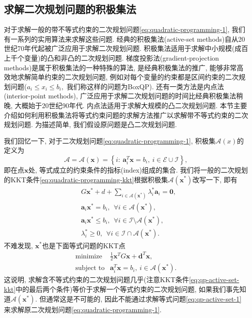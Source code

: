 \documentclass{SBCbookchapter}
\newcommand{\V}[1]{{\bm{#1}}}
\numberwithin{equation}{section}
\begin{document}
\subsection{求解二次规划问题的积极集法}
\label{subsec:7.2.2}

对于求解一般的带不等式约束的二次规划问题\eqref{eq:quadratic-programming-1}, 我们有一系列的实用算法来求解这些问题. 经典的积极集法(active-set methods)自从20世纪70年代起被广泛应用于求解二次规划问题. 积极集法适用于求解中小规模(成百上千个变量)的凸和非凸的二次规划问题. 梯度投影法(gradient-projection methods)是属于积极集法的一种特殊的算法, 是经典积极集法的推广, 能够非常高效地求解简单约束的二次规划问题, 例如对每个变量的约束都是区间约束的二次规划问题($a_i \leqslant x_i \leqslant b_i,$ 我们称这样的问题为BoxQP). 还有一类方法是内点法(interior-point methods), 广泛应用于求解二次规划问题的时间比经典积极集法稍晚, 大概始于20世纪90年代. 内点法适用于求解大规模的凸二次规划问题. 本节主要介绍如何利用积极集法将等式约束问题的求解方法推广以求解带不等式约束的二次规划问题. 为描述简单, 我们假设原问题是凸二次规划问题.

我们回忆一下, 对于二次规划问题\eqref{eq:quadratic-programming-1}, 积极集$\mathcal{A}(x)$的定义为
\begin{equation}
\label{eq:qp-active-set}
\mathcal{A} = \mathcal{A}(\V{x}) = \left\{ i : ~ \V{a}_i^T \V{x} = b_i, ~ i \in \mathcal{E} \cup \mathcal{I} \right\},
\end{equation}
即在点$\V{x}$处, 等式成立的约束条件的指标(index)组成的集合. 我们将一般的二次规划的KKT条件\eqref{eq:quadratic-programming-kkt}根据积极集$\mathcal{A}(\V{x}^*)$改写一下, 即有
\begin{equation}
\label{eq:qp-active-set-kkt}
\begin{aligned}
& G \V{x}^* + d + \sum\limits_{i \in \mathcal{A}(\V{x}^*)} \lambda_i^* \V{a}_i = \V{0}, \\
& \V{a}_i \V{x}^* = b_i, ~~ \forall i \in \mathcal{A}(\V{x}^*), \\
& \V{a}_i \V{x}^* \leqslant b_i, ~~ \forall i \in \mathcal{I} \setminus \mathcal{A}(\V{x}^*), \\
& \lambda_i^* \geqslant 0, ~~ \forall i \in \mathcal{I} \cap \mathcal{A}(\V{x}^*).
\end{aligned}
\end{equation}
不难发现, $\V{x}^*$也是下面等式问题的KKT点
\begin{equation}
\label{eq:qp-active-set-1}
\begin{array}{cl}
\text{minimize} & \frac{1}{2} \V{x}^T G \V{x} + \V{d}^T \V{x}, \\
\text{subject to} & \V{a}_i^T \V{x} = b_i, ~ i \in \mathcal{A}(\V{x}^*).
\end{array}
\end{equation}
这说明, 求解含不等式约束的二次规划问题几乎(注意KKT条件\eqref{eq:qp-active-set-kkt}中的最后两个条件)等价于求解一个等式约束的二次规划问题, 如果我们事先知道$\mathcal{A}(\V{x}^*).$ 但通常这是不可能的, 因此不能通过求解等式问题\eqref{eq:qp-active-set-1}来求解原二次规划问题\eqref{eq:quadratic-programming-1}.
\end{document}
